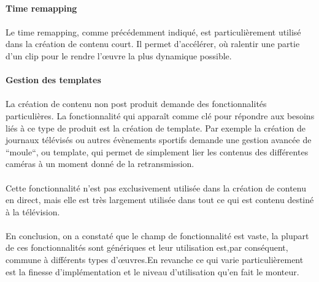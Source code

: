 \paragraph{Time remapping}

\paragraph{ }

Le time remapping, comme précédemment indiqué, est particulièrement
utilisé dans la création de contenu court. Il permet d'accélérer,
où ralentir une partie d'un clip pour le rendre l'œuvre la plus
dynamique possible.

\paragraph{Gestion des templates}

\paragraph{ }

La création de contenu non post produit demande des fonctionnalités
particulières. La fonctionnalité qui apparaît comme clé pour répondre
aux besoins liés à ce type de produit est la création de template. Par
exemple la création de journaux télévisés ou autres évènements
sportifs demande une gestion avancée de ``moule``, ou template, qui
permet de simplement lier les contenus des différentes caméras à un
moment donné de la retransmission.

\paragraph{ }

Cette fonctionnalité n'est pas exclusivement utilisée dans la création
de contenu en direct, mais elle est très largement utilisée dans tout
ce qui est contenu destiné à la télévision.

\paragraph{} \paragraph{}

En conclusion, on a constaté que le champ de fonctionnalité est vaste,
la plupart de ces fonctionnalités sont génériques et leur utilisation
est,par conséquent, commune à différents types d'œuvres.En revanche
ce qui varie particulièrement  est la finesse d'implémentation et le
niveau d'utilisation qu'en fait le monteur.

